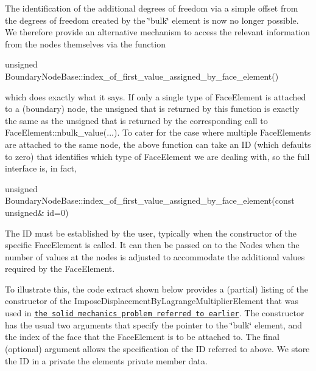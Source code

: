 The identification of the additional degrees of freedom via a simple offset from the degrees of freedom created by the \char`\"{}bulk\char`\"{} element is now no longer possible. We therefore provide an alternative mechanism to access the relevant information from the nodes themselves via the function 
\begin{DoxyCode}
\textcolor{keywordtype}{unsigned} BoundaryNodeBase::index\_of\_first\_value\_assigned\_by\_face\_element()
\end{DoxyCode}
 which does exactly what it says. If only a single type of {\ttfamily Face\+Element} is attached to a (boundary) node, the unsigned that is returned by this function is exactly the same as the unsigned that is returned by the corresponding call to {\ttfamily Face\+Element\+::nbulk\+\_\+value}(...). To cater for the case where multiple {\ttfamily Face\+Elements} are attached to the same node, the above function can take an ID (which defaults to zero) that identifies which type of {\ttfamily Face\+Element} we are dealing with, so the full interface is, in fact, 
\begin{DoxyCode}
\textcolor{keywordtype}{unsigned} BoundaryNodeBase::index\_of\_first\_value\_assigned\_by\_face\_element(\textcolor{keyword}{const} \textcolor{keywordtype}{unsigned}& \textcolor{keywordtype}{id}=0)
\end{DoxyCode}
 The ID must be established by the user, typically when the constructor of the specific {\ttfamily Face\+Element} is called. It can then be passed on to the {\ttfamily Nodes} when the number of values at the nodes is adjusted to accommodate the additional values required by the {\ttfamily Face\+Element}.

To illustrate this, the code extract shown below provides a (partial) listing of the constructor of the {\ttfamily Impose\+Displacement\+By\+Lagrange\+Multiplier\+Element} that was used in \href{../../../solid/prescribed_displ_lagr_mult/html/index.html}{\tt the solid mechanics problem referred to earlier}. The constructor has the usual two arguments that specify the pointer to the \char`\"{}bulk\char`\"{} element, and the index of the face that the {\ttfamily Face\+Element} is to be attached to. The final (optional) argument allows the specification of the ID referred to above. We store the ID in a private the element\textquotesingle{}s private member data.

